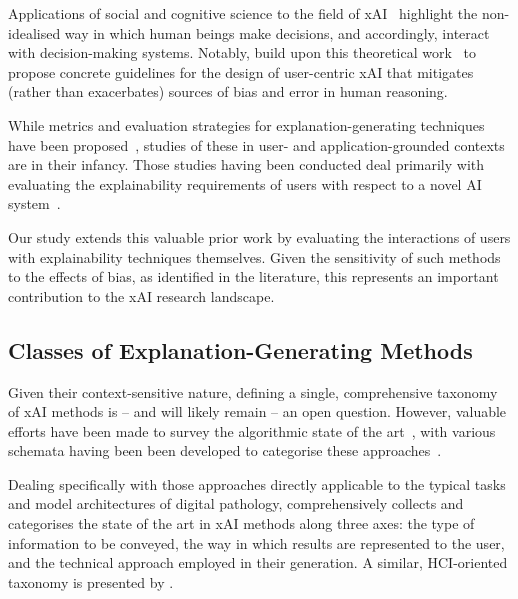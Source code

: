 \documentclass[final,5p,times,twocolumn,hyphens]{elsarticle}
\begin{document}
Applications of social and cognitive science to the field of xAI~\cite{de2017people, miller2019explanation, lipton2018mythos, jussupow2021augmenting} highlight the non-idealised way in which human beings make decisions, and accordingly, interact with decision-making systems. Notably, \citet{wang_designing_2019} build upon this theoretical work~\cite{hoffman2017explainingpart1,hoffman2017explainingpart2, klein2018explainingpart3, hoffman2018explainingpart4} to propose concrete guidelines for the design of user-centric xAI that mitigates (rather than exacerbates) sources of bias and error in human reasoning.

While metrics and evaluation strategies for explanation-generating techniques have been proposed~\cite{doshi2017towards, HolzingerEtAl:2019:Wiley-Paper, HolzingerEtAl:2020:QualityOfExplanations}, studies of these in user- and application-grounded contexts are in their infancy. Those studies having been conducted deal primarily with evaluating the explainability requirements of users with respect to a novel AI system~\cite{liao2020questioning, cai2019hello}.

Our study extends this valuable prior work by evaluating the interactions of users with explainability techniques themselves. Given the sensitivity of such methods to the effects of bias, as identified in the literature, this represents an important contribution to the xAI research landscape.

\subsection{Classes of Explanation-Generating Methods}
\label{sec:related:classes}

Given their context-sensitive nature, defining a single, comprehensive taxonomy of xAI methods is -- and will likely remain -- an open question. However, valuable efforts have been made to survey the algorithmic state of the art~\cite{tjoa_survey_2020, deshpande2021brief}, with various schemata having been been developed to categorise these approaches~\cite{arrieta2020explainable}.

Dealing specifically with those approaches directly applicable to the typical tasks and model architectures of digital pathology, \citet{poceviciute_survey_2020} comprehensively collects and categorises the state of the art in xAI methods along three axes: the type of information to be conveyed, the way in which results are represented to the user, and the technical approach employed in their generation. A similar, HCI-oriented taxonomy is presented by \citet{liao2020questioning}. 
\end{document}
